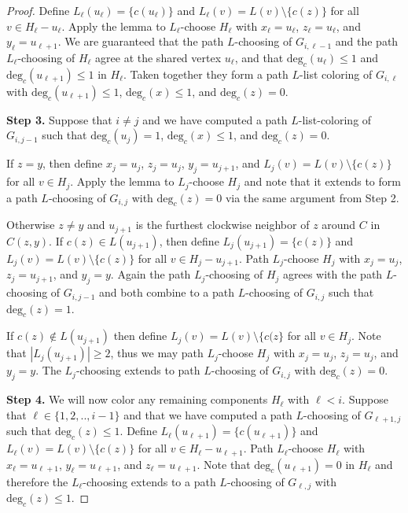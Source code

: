 \documentclass[12pt,letterpaper]{article}
\theoremstyle{plain}
\theoremstyle{definition}
\theoremstyle{break}
\begin{document}
\begin{proof}
Define $L_\ell(u_\ell)=\{c(u_\ell)\}$ and
$L_\ell(v)=L(v)\setminus\{c(z)\}$ for
all $v\in H_\ell-u_\ell$.
Apply the lemma to $L_\ell$-choose $H_\ell$ with
$x_\ell=u_\ell$, $z_\ell=u_\ell$, and
$y_\ell=u_{\ell+1}$. We are guaranteed that the path $L$-choosing
of $G_{i,\ell-1}$ and the path $L_\ell$-choosing of $H_\ell$ agree
at the shared vertex $u_\ell$, and that
$\text{deg}_c(u_\ell)\le 1$ and $\text{deg}_c(u_{\ell+1})\le 1$
in $H_\ell$. Taken together they form a
path $L$-list coloring of $G_{i,\ell}$ with $\text{deg}_c(u_{\ell+1})\le 1$,
$\text{deg}_c(x)\le 1$, and $\text{deg}_c(z)=0$.

\textbf{Step 3.} Suppose that $i\ne j$ and we
have computed a path $L$-list-coloring of $G_{i,j-1}$ such that
$\text{deg}_c(u_j)=1$, $\text{deg}_c(x)\le 1$, and $\text{deg}_c(z)=0$. 

If $z=y$, then
define $x_j=u_j$, $z_j=u_j$, $y_j=u_{j+1}$, and
$L_j(v)=L(v)\setminus\{c(z)\}$ for all $v\in H_j$. Apply the lemma to
$L_j$-choose
$H_j$ and note that it extends to form a path
$L$-choosing of $G_{i,j}$ with
$\text{deg}_c(z)=0$ via the same argument from Step 2.

Otherwise $z\ne y$ and $u_{j+1}$ is the furthest clockwise neighbor of $z$
around $C$ in $C(z,y)$. If $c(z)\in L(u_{j+1})$, then define
$L_j(u_{j+1})=\{c(z)\}$ and $L_j(v)=L(v)\setminus\{c(z)\}$ for all $v\in
H_j-u_{j+1}$. Path $L_j$-choose $H_j$ with $x_j=u_j$,
$z_j=u_{j+1}$, and $y_j=y$. Again the path $L_j$-choosing of $H_j$
agrees with the path $L$-choosing
of $G_{i,j-1}$ and both combine to a path $L$-choosing
of $G_{i,j}$ such that $\text{deg}_c(z)=1$.

If $c(z)\not\in L(u_{j+1})$
then define $L_j(v)=L(v)\setminus\{c(z\}$ for all $v\in H_j$. Note that
$|L_j(u_{j+1})|\ge 2$, thus we may path $L_j$-choose $H_j$ with
$x_j=u_j$, $z_j=u_j$, and $y_j=y$. The $L_j$-choosing extends to path
$L$-choosing of $G_{i,j}$ with $\text{deg}_c(z)=0$.

\textbf{Step 4.} We will
now color any remaining components $H_\ell$ with
$\ell<i$. Suppose that $\ell\in \{1,2,..,i-1\}$ and that we have
computed a path
$L$-choosing of $G_{\ell+1,j}$ such that $\text{deg}_c(z)\le 1$. Define
$L_\ell(u_{\ell+1})=\{c(u_{\ell+1})\}$
and $L_\ell(v)=L(v)\setminus\{c(z)\}$
for all $v\in H_\ell-u_{\ell+1}$. Path $L_\ell$-choose $H_\ell$ with
$x_\ell=u_{\ell+1}$, $y_\ell=u_{\ell+1}$, and $z_\ell=u_{\ell+1}$.
Note that $\text{deg}_c(u_{\ell+1})=0$ in $H_\ell$ and therefore the
$L_\ell$-choosing
extends to a path $L$-choosing of $G_{\ell,j}$ with $\text{deg}_c(z)\le
1$.


\end{proof}
\end{document}
